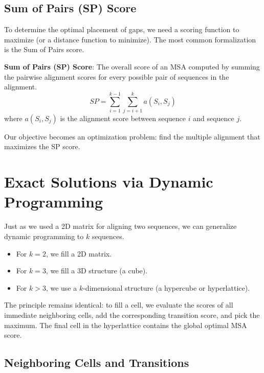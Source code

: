 \documentclass[11pt, a4paper]{article}
\newenvironment{important}
  {\begin{tcolorbox}[colback=blue!5!white, colframe=blue!75!black, arc=1mm, boxrule=1pt]}
  {\end{tcolorbox}}
\begin{document}

\subsection{Sum of Pairs (SP) Score}

To determine the optimal placement of gaps, we need a scoring function to maximize (or a distance function to minimize). The most common formalization is the Sum of Pairs score.

\begin{important}
  \textbf{Sum of Pairs (SP) Score}: The overall score of an MSA computed by summing the pairwise alignment scores for every possible pair of sequences in the alignment.
  \[
  SP = \sum_{i=1}^{k-1} \sum_{j=i+1}^k a(S_i, S_j)
  \]
  where $a(S_i, S_j)$ is the alignment score between sequence $i$ and sequence $j$.
\end{important}

Our objective becomes an optimization problem: find the multiple alignment that maximizes the SP score.

\section{Exact Solutions via Dynamic Programming}

Just as we used a 2D matrix for aligning two sequences, we can generalize dynamic programming to $k$ sequences.
\begin{itemize}
    \item For $k=2$, we fill a 2D matrix.
    \item For $k=3$, we fill a 3D structure (a cube).
    \item For $k>3$, we use a $k$-dimensional structure (a hypercube or hyperlattice).
\end{itemize}

The principle remains identical: to fill a cell, we evaluate the scores of all immediate neighboring cells, add the corresponding transition score, and pick the maximum. The final cell in the hyperlattice contains the global optimal MSA score.

\subsection{Neighboring Cells and Transitions}
\end{document}
